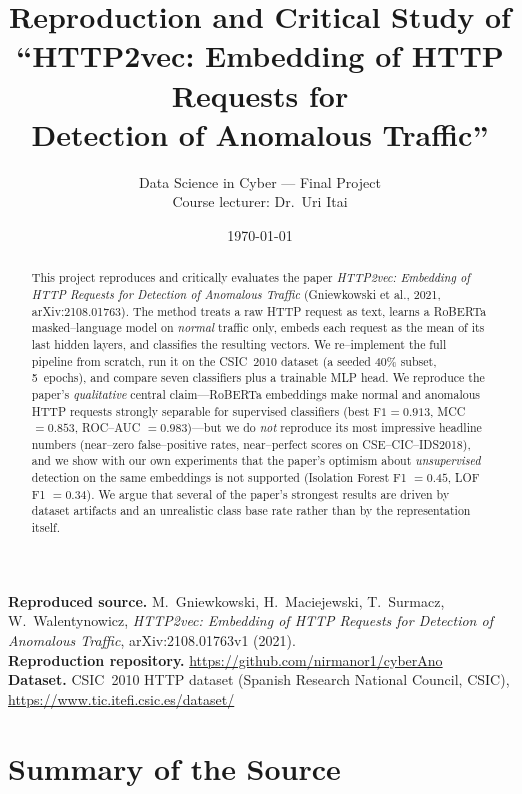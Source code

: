 \documentclass[11pt,a4paper]{article}
\title{\vspace{-1.2cm}\textbf{Reproduction and Critical Study of\\ ``HTTP2vec: Embedding of HTTP Requests for\\ Detection of Anomalous Traffic''}}
\author{Data Science in Cyber --- Final Project\\
Course lecturer: Dr.\ Uri Itai}
\date{\today}
\begin{document}
\maketitle
\vspace{-0.6cm}

\begin{abstract}
\noindent
This project reproduces and critically evaluates the paper \emph{HTTP2vec: Embedding
of HTTP Requests for Detection of Anomalous Traffic} (Gniewkowski et al., 2021,
arXiv:2108.01763). The method treats a raw HTTP request as text, learns a RoBERTa
masked--language model on \emph{normal} traffic only, embeds each request as the mean
of its last hidden layers, and classifies the resulting vectors. We re--implement the
full pipeline from scratch, run it on the CSIC~2010 dataset (a seeded 40\% subset,
5~epochs), and compare seven classifiers plus a trainable MLP head. We reproduce the
paper's \emph{qualitative} central claim---RoBERTa embeddings make normal and
anomalous HTTP requests strongly separable for supervised classifiers (best
$\text{F1}=0.913$, MCC $=0.853$, ROC--AUC $=0.983$)---but we do \emph{not} reproduce
its most impressive headline numbers (near--zero false--positive rates, near--perfect
scores on CSE--CIC--IDS2018), and we show with our own experiments that the paper's
optimism about \emph{unsupervised} detection on the same embeddings is not supported
(Isolation Forest F1 $=0.45$, LOF F1 $=0.34$). We argue that several of the paper's
strongest results are driven by dataset artifacts and an unrealistic class base rate
rather than by the representation itself.
\end{abstract}

\tableofcontents
\bigskip

\noindent\textbf{Reproduced source.} M.~Gniewkowski, H.~Maciejewski, T.~Surmacz, W.~Walentynowicz,
\emph{HTTP2vec: Embedding of HTTP Requests for Detection of Anomalous Traffic}, arXiv:2108.01763v1
(2021).\\
\textbf{Reproduction repository.} \url{https://github.com/nirmanor1/cyberAno}\\
\textbf{Dataset.} CSIC~2010 HTTP dataset (Spanish Research National Council, CSIC), \url{https://www.tic.itefi.csic.es/dataset/}

\clearpage

\section{Summary of the Source}
\label{sec:summary}
\end{document}
